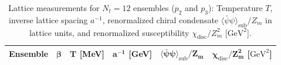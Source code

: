 \documentclass[11pt,a4paper]{article}
\begin{document}
\clearpage

\begin{table}[htbp]
    \centering
    \caption{Lattice measurements for $N_t=12$ ensembles ($p_2$ and $p_3$): Temperature $T$, inverse lattice spacing $a^{-1}$, renormalized chiral condensate $\langle\bar{\psi}\psi\rangle_{\mathrm{sub}}/Z_m$ in lattice units, and renormalized susceptibility $\chi_{\mathrm{disc}} / Z_m^2$ [$\text{GeV}^2$].}
    \label{tab:raw_p2_p3}
    \small
    \begin{tabular}{lccccc}
        \toprule
        \textbf{Ensemble} & $\boldsymbol{\beta}$ & $\boldsymbol{T}$ [MeV] & $\boldsymbol{a^{-1}}$ [GeV] & $\boldsymbol{\langle\bar{\psi}\psi\rangle_{\mathrm{sub}}/Z_m}$ & $\boldsymbol{\chi_{\mathrm{disc}} / Z_m^2}$ [$\text{GeV}^2$] \\
        \midrule


\end{tabular}
\end{table}
\end{document}
